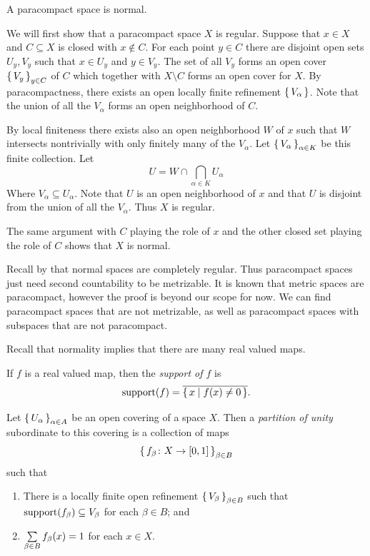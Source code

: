 \documentclass[letterpaper, 11pt, oneside]{book}
\begin{document}
\begin{thrm}\label{thrm: paracompact_is_normal}
  A paracompact space is normal.
\end{thrm}
\begin{pf}
  We will first show that a paracompact space $X$ is regular.
  Suppose that $x \in X$ and $C \subseteq X$ is closed with $x \notin C$.
  For each point $y \in C$ there are disjoint open sets $U_{y}, V_{y}$ such that $x \in U_{y}$ and $y \in V_{y}$.
  The set of all $V_{y}$ forms an open cover $\set{V_{y}}_{y \in C}$ of $C$ which together with $X \setminus C$ forms an open cover for $X$.
  By paracompactness, there exists an open locally finite refinement $\set{V_{\alpha}}$.
  Note that the union of all the $V_{\alpha}$ forms an open neighborhood of $C$.

  By local finiteness there exists also an open neighborhood $W$ of $x$ such that $W$ intersects nontrivially with only finitely many of the $V_{\alpha}$.
  Let $\set{V_{\alpha}}_{\alpha \in K}$ be this finite collection.
  Let
  \[
    U = W \cap \bigcap_{\alpha \in K} U_{\alpha}
  \]
  Where $V_{\alpha} \subseteq U_{\alpha}$.
  Note that $U$ is an open neighborhood of $x$ and that $U$ is disjoint from the union of all the $V_{\alpha}$.
  Thus $X$ is regular.

  The same argument with $C$ playing the role of $x$ and the other closed set playing the role of $C$ shows that $X$ is normal.
\end{pf}

Recall by  that normal spaces are completely regular.
Thus paracompact spaces just need second countability to be metrizable.
It is known that metric spaces are paracompact, however the proof is beyond our scope for now.
We can find paracompact spaces that are not metrizable, as well as paracompact spaces with subspaces that are not paracompact.

Recall that normality implies that there are many real valued maps.
\begin{defn}[Support]
  If $f$ is a real valued map, then the \emph{support of $f$} is
  \[
    \operatorname{support}(f) = \overline{\set{x | f(x) \neq 0}}.
  \]
\end{defn}

\begin{defn}
  Let $\set{U_{\alpha}}_{\alpha \in A}$ be an open covering of a space $X$.
  Then a \emph{partition of unity} subordinate to this covering is a collection of maps
  \[
    \set{f_{\beta}\colon X \to [0, 1]}_{\beta \in B}
  \]
  such that
  \begin{enumerate}
  \item There is a locally finite open refinement $\set{V_{\beta}}_{\beta \in B}$ such that $\operatorname{support}(f_{\beta}) \subseteq V_{\beta}$ for each $\beta \in B$; and
  \item $\sum\limits_{\beta \in B} f_{\beta}(x) = 1$ for each $x \in X$.
  \end{enumerate}
\end{defn}
\end{document}
